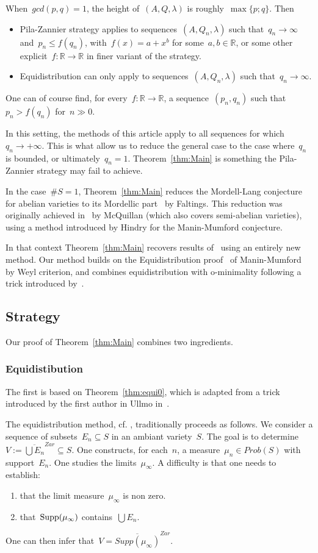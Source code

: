 \documentclass[12pt]{amsart}
\newcommand{\Supp}{{\rm Supp}}
\newcommand{\R}{{\mathbb R}}
\newcommand{\ol}{\overline}
\begin{document}
When~$gcd(p,q)=1$, the height of~$(A,Q,\lambda)$ is roughly~$\max\{p;q\}$. Then
\begin{itemize}
\item Pila-Zannier strategy applies to sequences~$(A,Q_n,\lambda)$ such that~$q_n\to \infty$ and~$p_n\leq f(q_n)$, with~$f(x)=a+x^b$ for some~$a,b\in\R$, or some other explicit~$f:\R\to \R$ in finer variant of the strategy.
\item Equidistribution can only apply to sequences~$(A,Q_n,\lambda)$ such that~$q_n\to \infty$.
\end{itemize}
One can of course find, for every~$f:\R\to\R$, a sequence~$(p_n,q_n)$ such that~$p_n>f(q_n)$ for~$n\gg0$.

In this setting, the methods of this article apply to all sequences for which~$q_n\to +\infty$. This is what allow us to reduce the general case to the case where~$q_n$ is bounded, or ultimately~$q_n=1$. Theorem~\ref{thm:Main} is something the Pila-Zannier strategy may fail to achieve.

In the case~$\#S=1$, Theorem~\ref{thm:Main} reduces the Mordell-Lang conjecture for abelian varieties to its Mordellic part~\cite{Fal91} by Faltings. This reduction was originally achieved in~\cite{McQ} by McQuillan (which also covers semi-abelian varieties), using a method introduced by Hindry for the Manin-Mumford conjecture.

In that context Theorem~\ref{thm:Main} recovers results of~\cite{McQ} using an entirely new method. Our method  builds on the Equidistribution proof~\cite{RWeyl} of Manin-Mumford by Weyl criterion, and combines equidistribution with o-minimality following a trick introduced by~\cite{RU}. 

\subsection{Strategy}

Our proof of Theorem~\ref{thm:Main} combines two ingredients.
\subsubsection{Equidistibution} The first is based on Theorem~\ref{thm:equi0}, which is adapted from a trick introduced by the first author in Ullmo in~\cite{RU}. 

The equidistribution method, cf. \cite{U}, traditionally proceeds as follows. We consider a sequence of subsets~$E_n\subseteq S$ in an ambiant variety~$S$. The goal is to determine~$V:=\ol{\bigcup E_n}^{Zar}\subseteq S$. One constructs, for each~$n$, a measure~$\mu_n\in Prob(S)$ with support~$E_n$. One studies the limits~$\mu_\infty$. A difficulty is that one needs to establish:
\begin{enumerate}
\item \label{enum:equi1}
that the limit measure~$\mu_\infty$ is non zero.
\item \label{enum:equi2}
that~$\Supp(\mu_\infty)$ contains~$\bigcup E_n$.
\end{enumerate}
One can then infer that~$V=\ol{Supp(\mu_\infty)}^{Zar}$.
\end{document}
